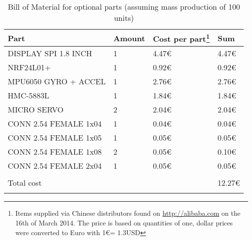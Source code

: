 \newpage

\begin{longtabu} to \textwidth { X[3,l] X[1,r] X[1,r] X[1,r]}
\toprule
Part & Amount & Cost per part\footnote{Items supplied via Chinese distributors found on \url{http://alibaba.com} on the 16th of March 2014. The price is based on quantities of one, dollar prices were converted to Euro with 1\euro = 1.3USD } & Sum \\
\midrule
DISPLAY SPI 1.8 INCH & 1 & 4.47\euro & 4.47\euro \\
NRF24L01+ & 1 & 0.92\euro & 0.92\euro \\
MPU6050 GYRO + ACCEL & 1 & 2.76\euro & 2.76\euro \\
HMC-5883L & 1 & 1.84\euro & 1.84\euro \\
MICRO SERVO & 2 & 2.04\euro & 2.04\euro \\
CONN 2.54 FEMALE 1x04 & 1 & 0.04\euro & 0.04\euro \\
CONN 2.54 FEMALE 1x05 & 1 & 0.05\euro & 0.05\euro \\
CONN 2.54 FEMALE 1x08 & 2 & 0.05\euro & 0.10\euro \\
CONN 2.54 FEMALE 2x04 & 1 & 0.05\euro & 0.05\euro \\
\hline \\
Total cost& & & 12.27\euro \\
\bottomrule
\caption{Bill of Material for optional parts (assuming mass production of 100 units)}
\label{tbl:bom_opt}
\end{longtabu}

%

